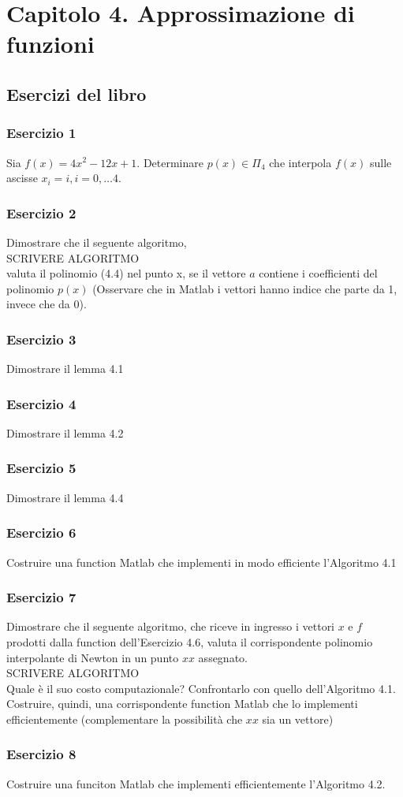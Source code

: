 \chapter{Capitolo 4. Approssimazione di funzioni}
\section{Esercizi del libro}
\subsection{Esercizio 1}
Sia $f(x) = 4x^{2} - 12x +1$. Determinare $p(x) \in \Pi_{4} $ che interpola $f(x)$ sulle ascisse $x_{i} = i, i = 0, \ldots 4$.
\subsection{Esercizio 2} Dimostrare che il seguente algoritmo, \\
SCRIVERE ALGORITMO\\
valuta il polinomio (4.4) nel punto x, se il vettore $a$ contiene i coefficienti del polinomio $p(x)$ (Osservare che in Matlab i vettori hanno indice che parte da 1, invece che da 0).
\subsection{Esercizio 3}
Dimostrare il lemma 4.1
\subsection{Esercizio 4}
Dimostrare il lemma 4.2
\subsection{Esercizio 5}
Dimostrare il lemma 4.4
\subsection{Esercizio 6}
Costruire una function Matlab che implementi in modo efficiente l'Algoritmo 4.1
\subsection{Esercizio 7}
Dimostrare che il seguente algoritmo, che riceve in ingresso i vettori $x$ e $f$ prodotti dalla function dell'Esercizio 4.6, valuta il corrispondente polinomio interpolante di Newton in un punto $xx$
assegnato.\\
SCRIVERE ALGORITMO\\
Quale è il suo costo computazionale? Confrontarlo con quello dell'Algoritmo 4.1. Costruire, quindi, una corrispondente function Matlab che lo implementi efficientemente (complementare la possibilità che $xx$ sia un vettore)
\subsection{Esercizio 8}
Costruire una funciton Matlab che implementi efficientemente l'Algoritmo 4.2.